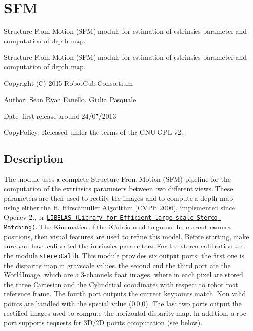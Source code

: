 \section{S\+FM}
\label{group__SFM}


Structure From Motion (S\+FM) module for estimation of estrinsics parameter and computation of depth map.  


Structure From Motion (S\+FM) module for estimation of estrinsics parameter and computation of depth map. 

Copyright (C) 2015 Robot\+Cub Consortium

Author\+: Sean Ryan Fanello, Giulia Pasquale

Date\+: first release around 24/07/2013

Copy\+Policy\+: Released under the terms of the G\+NU G\+PL v2..\hypertarget{group__SFM_intro_sec}{}\subsection{Description}\label{group__SFM_intro_sec}
The module uses a complete Structure From Motion (S\+FM) pipeline for the computation of the extrinsics parameters between two different views. These parameters are then used to rectify the images and to compute a depth map using either the H. Hirschmuller Algorithm (C\+V\+PR 2006), implemented since Opencv 2., or \href{http://www.cvlibs.net/software/libelas/}{\tt L\+I\+B\+E\+L\+AS (Library for Efficient Large-\/scale Stereo Matching)}. The Kinematics of the i\+Cub is used to guess the current camera positions, then visual features are used to refine this model. Before starting, make sure you have calibrated the intrinsics parameters. For the stereo calibration see the module \href{http://wiki.icub.org/iCub/main/dox/html/group__icub__stereoCalib.html}{\tt stereo\+Calib}. This module provides six output ports\+: the first one is the disparity map in grayscale values, the second and the third port are the World\+Image, which are a 3-\/channels float images, where in each pixel are stored the three Cartesian and the Cylindrical coordinates with respect to robot root reference frame. The fourth port outputs the current keypoints match. Non valid points are handled with the special value (0,0,0). The last two ports output the rectified images used to compute the horizontal disparity map. In addition, a rpc port supports requests for 3\+D/2D points computation (see below).

